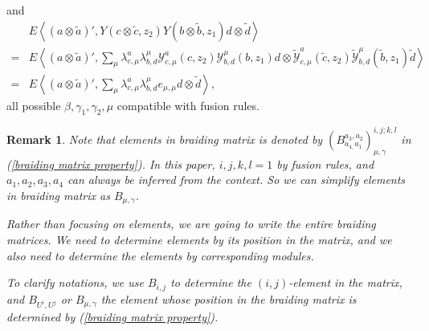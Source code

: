 \documentclass{article}
\newtheorem{remark}[lemma]{Remark}
\begin{document}
and
$$
\begin{aligned}
&E\left\langle {(a\otimes \tilde{a})}',
Y(c\otimes \tilde{c},z_2)Y(b\otimes \tilde{b},z_1)d\otimes \tilde{d}\right\rangle\\
=&E\left\langle {(a\otimes \tilde{a})}',
\sum_{\mu}\lambda_{c,\mu}^a\lambda_{b,d}^{\mu} 
\mathcal{Y}_{c,\mu}^a(c,z_2)\mathcal{Y}_{b,d}^{\mu}(b,z_1)d
\otimes 
\tilde{\mathcal{Y}}_{c,\mu}^a(\tilde{c},z_2)\tilde{\mathcal{Y}}_{b,d}^{\mu}(\tilde{b},z_1)\tilde{d}\right\rangle\\
=&E\left\langle {(a\otimes \tilde{a})}',
\sum_{\mu}\lambda_{c,\mu}^a\lambda_{b,d}^{\mu} 
e_{\mu,\mu}d\otimes\tilde{d}\right\rangle,
\end{aligned}
$$
all possible $\beta,\gamma_1,\gamma_2,\mu$ compatible with fusion rules.

\begin{remark}
Note that elements in braiding matrix is denoted by $\left(B_{a_{4,}a_{1}}^{a_{3},a_{2}}\right)_{\mu,\gamma}^{i,j;k,l}$ in (\ref{braiding matrix property}).
In this paper, $i,j,k,l=1$ by fusion rules, and $a_1,a_2,a_3,a_4$ can always be inferred from the context.
So we can simplify elements in braiding matrix as $B_{\mu,\gamma}$.

Rather than focusing on elements, 
we are going to write the entire braiding matrices.
We need to determine elements by its position in the matrix, 
and we also need to determine the elements by corresponding modules.

To clarify notations, 
we use $B_{i,j}$ to determine the $(i,j)$-element in the matrix,
and $B_{U^i,U^j}$ or $B_{\mu,\gamma}$ the element whose position in the braiding matrix
is determined by (\ref{braiding matrix property}).
\end{remark}

\end{document}
